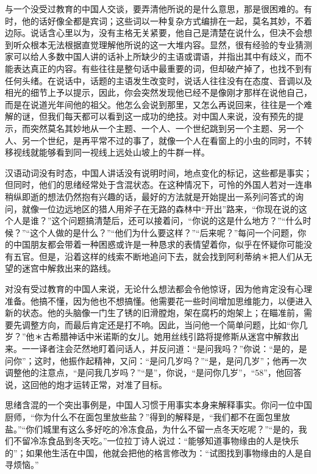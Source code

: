 \documentclass[12pt,oneside]{book}
\begin{document}
\begin{common-format}
与一个没受过教育的中国人交谈，要弄清他所说的是什么意思，那是很困难的。有时，他的话好像全都是宾词；这些词以一种复杂方式编排在一起，莫名其妙，不着边际。说话含心里以为，没有主格无关紧要，他自己是清楚在说什么，但决不会想到听众根本无法根据直觉理解他所说的这一大堆内容。显然，很有经验的专业猜测家可以给人多数中国人讲的话补上所缺少的主语或谓语，并指出其中有歧义，而不能表达真正的内容。有些往往是整句话中最重要的词，但却破产掉了，也找不到有任何头绪。在说话中，话题的主语发生改变时，说话人往往没有在态度、音调以及相光的细节上予以提示，因此，你会突然发现他已经不是像刚才那样在说他自己，而是在说道光年间他的祖父。他怎么会说到那里，又怎么再说回来，往往是一个难解的谜，但我们每天都可以看到这一成功的绝技。对中国人来说，没有预先的提示，而突然莫名其妙地从一个主题、一个人、一个世纪跳到另一个主题、另一个人、另一个世纪，是再平常不过的事了，就像一个人在看窗上的小虫的同时，不转移视线就能够看到同一视线上远处山坡上的牛群一样。 

汉语动词没有时态，中国人讲话没有说明时间，地点变化的标记，这些都是事实；但同时，他们的思绪经常处于含混状态。在这种情况下，可怜的外国人若对一连串稍纵即逝的想法仍然抱有兴趣的话，最好的方法就是开始提出一系列问答式的询问，就像一位边远地区的猎人用斧子在无路的森林中“开出”路来，“你现在说的这个人是谁？”这个问题搞清楚后，还可以接着问，“你说的这是什么地方？”“什么时候？”“这个人做的是什么？”“他们为什么要这样？”“后来呢？”每问一个问题，你的中国朋友都会带着一种困惑或许是一种恳求的表情望着你，似乎在怀疑你可能没有五官。但是，沿着这样的线索不断地追问下去，就会找到阿利蒂纳＊把人们从无望的迷宫中解救出来的路线。 

对没有受过教育的中国人来说，无论什么想法都会令他惊讶，因为他肯定没有心理准备。他搞不懂，因为他也不想搞懂。他需要花一些时间增加思维能力，以便进入新的状态。他的头脑像一门生了锈的旧滑膛炮，架在腐朽的炮架上；在瞄准前，需要先调整方向，而最后肯定还是打不响。因此，当问他一个简单问题，比如“你几岁？”他＊古希腊神话中米诺斯的女儿。她用丝线引路将提修斯从迷宫中解救出来。一一译者注会茫然地盯着问话人，并反问道：“是问我吗？”你说：“是的，是问你”；这时，他振作起精神，又问：“是问几岁吗？”“是，是问几岁”；他再一次调整他的注意点，“是问我几岁吗？”“是”，你说，“是问你几岁”，“58”，他回答说，这回他的炮才运转正常，对准了目标。 

思绪含混的一个突出事例是，中国人习惯于用事实本身来解释事实。你问一位中国厨师，“你为什么不在面包里放些盐？”得到的解释是，“我们都不在面包里放盐。”“你们城里有这么多好吃的冷冻食品，为什么不留一点冬天吃呢？”“是的，我们不留冷冻食品到冬天吃。”一位拉丁诗人说过：“能够知道事物缘由的人是快乐的”；如果他生活在中国，他就会把他的格言修改为：“试图找到事物缘由的人是自寻烦恼。” 


\end{common-format}
\end{document}
